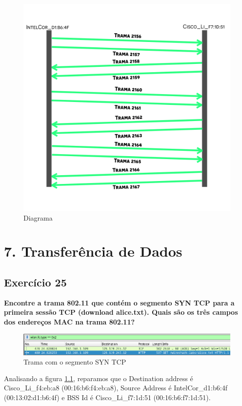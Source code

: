 \documentclass[a4paper]{report}
\begin{document}
\begin{figure}[H]
    \centering 
    \includegraphics[width=\textwidth]{images/diagramaEx24.png}  
    \caption{Diagrama}
    \label{fig:diagramaEx24}
\end{figure}

\chapter{7. Transferência de Dados}

\section{Exercício 25}
\textbf{Encontre a trama 802.11 que contém o segmento SYN TCP para a primeira
sessão TCP (download alice.txt). Quais são os três campos dos endereços MAC
na trama 802.11?}\\

\begin{figure}[H]
    \centering 
    \includegraphics[width=\textwidth]{images/tramaEx25.png}  
    \caption{Trama com o segmento SYN TCP}
    \label{fig:tramaEx25}
\end{figure}
Analisando a figura \ref{fig:tramaEx25}, reparamos que o Destination address é
Cisco\_Li\_f4:eb:a8 (00:16:b6:f4:eb:a8), Source Address é IntelCor\_d1:b6:4f 
(00:13:02:d1:b6:4f) e BSS Id é Cisco\_Li\_f7:1d:51 (00:16:b6:f7:1d:51).
\end{document}
